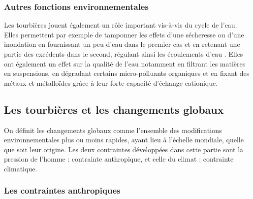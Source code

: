 \subsubsection{Autres fonctions environnementales}

Les tourbières jouent également un rôle important vis-à-vis du cycle de l'eau.
Elles permettent par exemple de tamponner les effets d'une sécheresse ou d'une inondation en fournissant un peu d'eau dans le premier cas et en retenant une partie des excédents dans le second, régulant ainsi les écoulements d'eau \citep{joosten2002,parish2008}.
Elles ont également un effet sur la qualité de l'eau notamment en filtrant les matières en suspensions, en dégradant certains micro-polluants organiques et en fixant des métaux et métalloïdes grâce à leur forte capacité d'échange cationique.


\subsection{Les tourbières et les changements globaux}
On définit les changements globaux comme l'ensemble des modifications environnementales plus ou moins rapides, ayant lieu à l'échelle mondiale, quelle que soit leur origine. Les deux contraintes développées dans cette partie sont la pression de l'homme : contrainte anthropique, et celle du climat : contrainte climatique.

\subsubsection{Les contraintes anthropiques}

